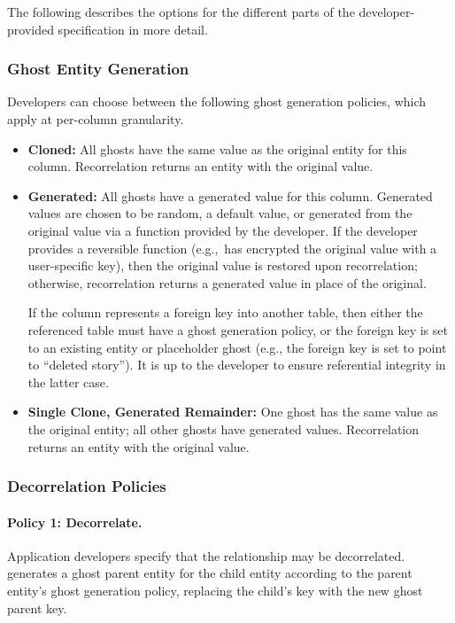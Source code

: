 \noindent The following describes the options for the different parts of the developer-provided
specification in more detail.

\subsubsection{Ghost Entity Generation}
Developers can choose between the following ghost generation policies, which apply at 
per-column granularity.
\begin{itemize}
    \item \textbf{Cloned:} All ghosts have the same value as the original entity for this column.
        Recorrelation returns an entity with the original value.

    \item \textbf{Generated:} All ghosts have a generated value for this column. Generated values are
chosen to be random, a default value, or generated from the original value via a function provided by the developer.
        If the developer provides a reversible function (e.g.,\ has encrypted the original value
        with a user-specific key), then the original value is restored upon
        recorrelation; otherwise, recorrelation returns a generated value in place of the original.

        If the column represents a foreign key into another table, then either the referenced table must 
        have a ghost generation policy, or the foreign key is set to an existing entity or placeholder ghost (e.g.,
        the foreign key is set to point to ``deleted story''). It is up to the developer to ensure
        referential integrity in the latter case.

\item \textbf{Single Clone, Generated Remainder:} One ghost has the same value as the original
        entity; all other ghosts have generated values. Recorrelation returns an entity with the original value.
\end{itemize}


\subsubsection{Decorrelation Policies}

\paragraph{Policy 1: Decorrelate.}
Application developers specify that the relationship may be decorrelated.
\sys{} generates a ghost parent entity for the child entity according to the parent entity's ghost
generation policy, replacing the child's key with the new ghost parent key.

